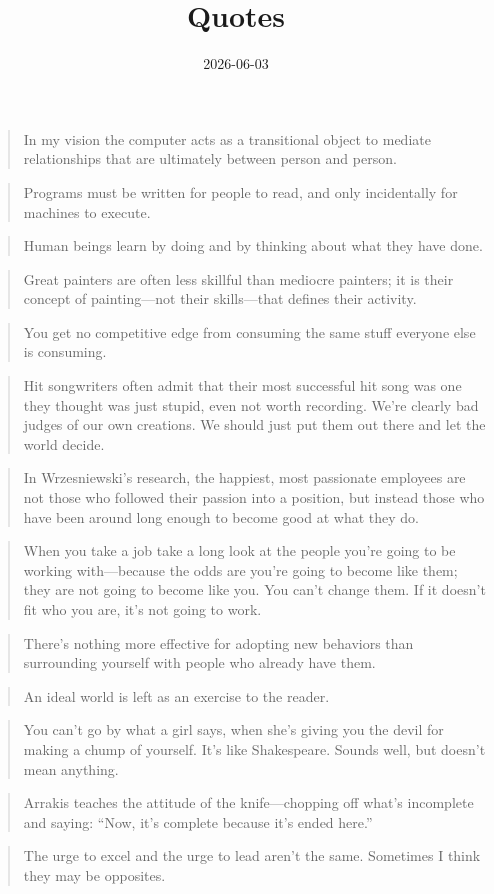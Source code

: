 \documentclass{note}
\title{Quotes}
\date{2026-06-03}
\begin{document}
\blockquote{
  In my vision the computer acts as a transitional object
  to mediate relationships that are ultimately between person and person.
}{}

\blockquote{
  Programs must be written for people to read,
  and only incidentally for machines to execute.
}{}

\blockquote{
  Human beings learn by doing and by thinking about what they have done.
}{}

\blockquote{
  Great painters are often less skillful than mediocre painters;
  it is their concept of painting---not their skills---that defines their activity.
}{}

\blockquote{
  You get no competitive edge from consuming the same stuff everyone else is consuming.
}{}

\blockquote{
  Hit songwriters often admit that their most successful hit song was one they thought was just stupid,
  even not worth recording.
  We're clearly bad judges of our own creations.
  We should just put them out there and let the world decide.
}{}

\blockquote{
  In Wrzesniewski's research,
  the happiest, most passionate employees
  are not those who followed their passion into a position,
  but instead those who have been around long enough
  to become good at what they do.
}{}

\blockquote{
  When you take a job
  take a long look at the people
  you're going to be working with---because
  the odds are
  you're going to become like them;
  they are not going to become like you.
  You can't change them.
  If it doesn't fit who you are,
  it's not going to work.
}{}

\blockquote{
  There's nothing more effective for adopting new behaviors
  than surrounding yourself with people who already have them.
}{}

\blockquote{
  An ideal world is left as an exercise to the reader.
}{}

\blockquote{
  You can't go by what a girl says,
  when she's giving you the devil for making a chump of yourself.
  It's like Shakespeare.
  Sounds well, but doesn't mean anything.
}{}

\blockquote{
  Arrakis teaches the attitude of the knife---chopping off
  what's incomplete and saying:
  ``Now, it's complete because it's ended here.''
}{}

\blockquote{
  The urge to excel and the urge to lead aren’t the same.
  Sometimes I think they may be opposites.
}{}
\end{document}
